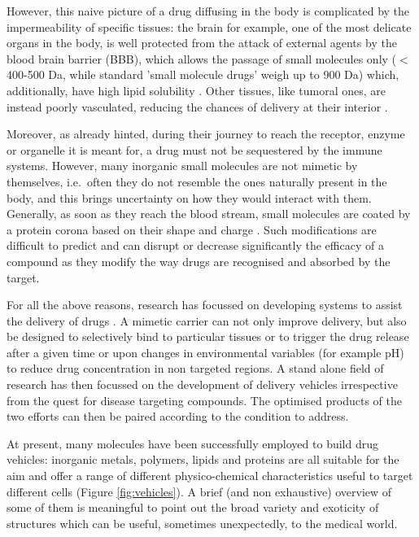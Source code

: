 However, this naive picture of a drug diffusing in the body is complicated by the impermeability of specific tissues: the brain for example, one of the most delicate organs in the body, is well protected from the attack of external agents by the blood brain barrier (BBB), which allows the passage of small molecules only ($<$ 400-500 Da, while standard 'small molecule drugs' weigh up to 900 Da) which, additionally, have high lipid solubility \cite{Pattni2015, Krol2012}. Other tissues, like tumoral ones, are instead poorly vasculated, reducing the chances of delivery at their interior \cite{Pattni2015}.

Moreover, as already hinted, during their journey to reach the receptor, enzyme or organelle it is meant for, a drug must not be sequestered by the immune systems. However, many inorganic small molecules are not mimetic by themselves, i.e.\ often they do not resemble the ones naturally present in the body, and this brings uncertainty on how they would interact with them. Generally, as soon as they reach the blood stream, small molecules are coated by a protein corona based on their shape and charge \cite{Krol2012}. Such modifications are difficult to predict and can disrupt or decrease significantly the efficacy of a compound as they modify the way drugs are recognised and absorbed by the target. 

For all the above reasons, research has focussed on developing systems to assist the delivery of drugs \cite{Jain2016, Pattni2015, Mitragotri2014}. A mimetic carrier can not only improve delivery, but also be designed to selectively bind to particular tissues or to trigger the drug release after a given time or upon changes in environmental variables (for example pH) to reduce drug concentration in non targeted regions. A stand alone field of research has then focussed on the development of delivery vehicles irrespective from the quest for disease targeting compounds. The optimised products of the two efforts can then be paired according to the condition to address.

At present, many molecules have been successfully employed to build drug vehicles: inorganic metals, polymers, lipids and proteins are all suitable for the aim and offer a range of different physico-chemical characteristics useful to target different cells \cite{Hughes2005} (Figure \ref{fig:vehicles}). A brief (and non exhaustive) overview of some of them is meaningful to point out the broad variety and exoticity of structures which can be useful, sometimes unexpectedly, to the medical world.


